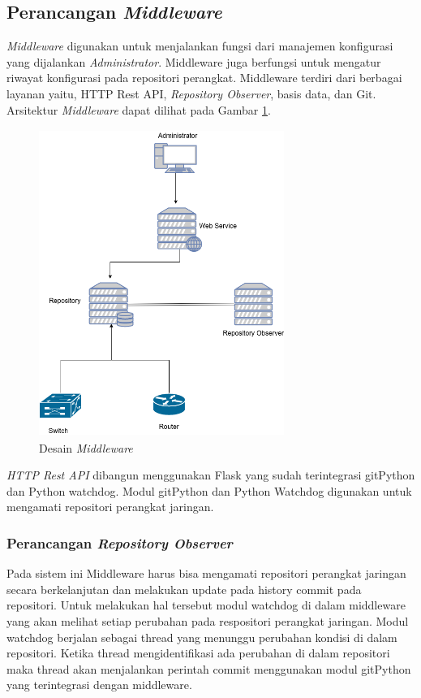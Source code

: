 		\subsection{Perancangan \textit{Middleware}}
        	\textit{Middleware} digunakan untuk menjalankan fungsi dari manajemen konfigurasi yang dijalankan \textit{Administrator}. Middleware juga berfungsi untuk mengatur riwayat konfigurasi pada repositori perangkat. Middleware terdiri dari berbagai layanan yaitu, HTTP Rest API, \textit{Repository Observer}, basis data, dan Git. Arsitektur \textit{Middleware} dapat dilihat pada Gambar \ref{desain:middleware}. \\
            
                \begin{figure}[H]
                    \centering
                    \includegraphics[width=8cm,height=10cm]{Images/C-3/Middleware.png}
                    \caption{Desain \textit{Middleware}}
                    \label{desain:middleware}
				\end{figure}
            \indent \textit{HTTP Rest API} dibangun menggunakan Flask yang sudah terintegrasi gitPython dan Python watchdog. Modul gitPython dan Python Watchdog digunakan untuk mengamati repositori perangkat jaringan.
            
        \subsubsection{Perancangan \textit{Repository Observer}}
            Pada sistem ini Middleware harus bisa mengamati repositori perangkat jaringan secara berkelanjutan dan melakukan update pada history commit pada repositori. Untuk melakukan hal tersebut modul watchdog di dalam middleware yang akan melihat setiap perubahan pada respositori perangkat jaringan. Modul watchdog berjalan sebagai thread yang menunggu perubahan kondisi di dalam repositori. Ketika thread mengidentifikasi ada perubahan di dalam repositori maka thread akan menjalankan perintah commit menggunakan modul gitPython yang terintegrasi dengan middleware.  
        
